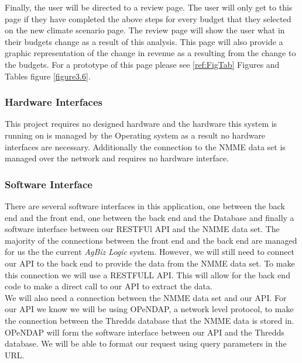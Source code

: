 \documentclass[onecolumn, draftclsnofoot,10pt, compsoc]{article}
\begin{document}
					Finally, the user will be directed to a review page. The user will only get to this page if they have completed the above steps for every budget that they selected on the new climate scenario page. The review page will show the user what in their budgets change as a result of this analysis. This page will also provide a graphic representation of the change in revenue as a resulting from the change to the budgets. For a prototype of this page please see \ref{ref:FigTab} Figures and Tables figure \ref{figure3.6}.\\
					

        \subsubsection{Hardware Interfaces}
					This project requires no designed hardware and the hardware this system is running on is managed by the Operating system as a result no hardware interfaces are necessary. Additionally the connection to the NMME data set is managed over the network and requires no hardware interface.\\

        \subsubsection{Software Interface}
					There are several software interfaces in this application, one between the back end and the front end, one between the back end and the Database and finally a software interface between our RESTFUl API and the NMME data set. The majority of the connections between the front end and the back end are managed for us the the current \textit{AgBiz Logic} system. However, we will still need to connect our API to the back end to provide the data from the NMME data set. To make this connection we will use a RESTFULL API. This will allow for the back end code to make a direct call to our API to extract the data.\\
					We will also need a connection between the NMME data set and our API. For our API we know we will be using OPeNDAP, a network level protocol, to make the connection between the Thredds database that the NMME data is stored in. OPeNDAP will form the software interface between our API and the Thredds database. We will be able to format our request using query parameters in the URL.\\
\end{document}
